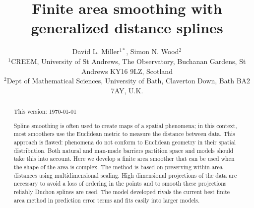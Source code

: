 \documentclass[useAMS, referee]{biom}
\title[Finite area smoothing with generalized distance splines]{Finite area smoothing with generalized distance splines}
\author{David L. Miller$^{1*}$\email{dave@ninepointeightone.net}, Simon N. Wood$^{2}$\\
$^{1}$CREEM, University of St Andrews, The Observatory, Buchanan Gardens, St Andrews KY16 9LZ, Scotland\\
$^{2}$Dept of Mathematical Sciences, University of Bath, Claverton Down, Bath BA2 7AY, U.K.
}
\begin{document}








\label{firstpage}


\begin{abstract}
This version: \today %

Spline smoothing is often used to create maps of a spatial phenomena; in this context, most smoothers use the Euclidean metric to measure the distance between data. This approach is flawed: phenomena do not conform to Euclidean geometry in their spatial distribution. Both natural and man-made barriers partition space and models should take this into account. Here we develop a finite area smoother that can be used  when the shape of the area is complex. The method is based on preserving within-area distances using multidimensional scaling. High dimensional projections of the data are necessary to avoid a loss of ordering in the points and to smooth these projections reliably Duchon splines are used. The model developed rivals the current best finite area method in prediction error terms and fits easily into larger models.
\end{abstract}
\end{document}
